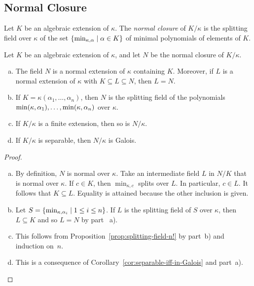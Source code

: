 \subsection{Normal Closure}

\begin{defn}
    Let $K$ be an algebraic extension of $\kappa$. The \textsl{normal closure} of $K / \kappa$ is the splitting field over $\kappa$ of the set $\{\operatorname{min}_{\kappa, \alpha} \mid \alpha \in K\}$ of minimal polynomials of elements of $K$.
\end{defn}

\begin{prop}\label{prop:normal-closure-properties}
    Let\/ $K$ be an algebraic extension of\/ $\kappa$, and let\/ $N$ be the normal closure of\/ $K / \kappa$. 
    \begin{enumerate}[a), font=\upshape]
        \item The field\/ $N$ is a normal extension of\/ $\kappa$ containing\/ $K$. Moreover, if\/ $L$ is a normal extension of\/ $\kappa$ with\/ $K \subseteq L \subseteq N$, then\/ $L = N$. 
        \item If\/ $K = \kappa(\alpha_1, \dots, \alpha_n)$, then\/ $N$ is the splitting field of the polynomials\/ $\operatorname{min}(\kappa, \alpha_1), \dots, \operatorname{min}(\kappa, \alpha_n)$ over\/ $\kappa$.
        \item If\/ $K / \kappa$ is a finite extension, then so is\/ $N / \kappa$. 
        \item If\/ $K / \kappa$ is separable, then\/ $N / \kappa$ is Galois.
    \end{enumerate}
\end{prop}

\begin{proof}${}$
    \begin{enumerate}[a), font=\upshape]
        \item By definition, $N$ is normal over $\kappa$. Take an intermediate field $L$ in $N/K$ that is normal over $\kappa$. If $c\in K$, then $\min_{\kappa,c}$ splits over $L$. In particular, $c\in L$. It follows that $K\subseteq L$. Equality is attained because the other inclusion is given.

        \item Let $S=\{\operatorname{min}_{\kappa,\alpha_i}\mid 1\le i\le n\}$. If $L$ is the splitting field of $S$ over $\kappa$, then $L\subseteq K$ and so $L=N$ by part ~a).

        \item This follows from Proposition~\ref{prop:splitting-field-n!} by part~b) and induction on~$n$.

        \item This is a consequence of Corollary~\ref{cor:separable-iff-in-Galois} and part~a).
    \end{enumerate}
    
\end{proof}

